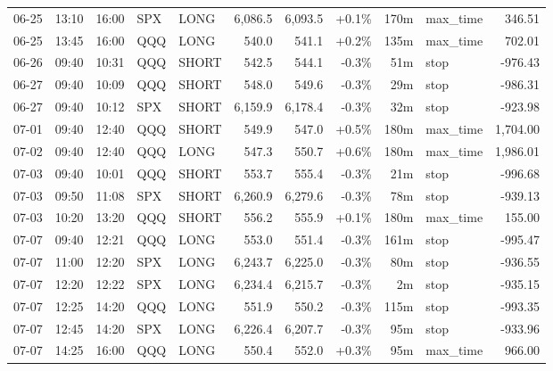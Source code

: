 \documentclass[11pt,a4paper,twoside]{article}
\begin{document}
\begin{center}
\begin{longtable}{>{\color{txtmain}}l l l l l r r r r >{\color{txtmain}}l r}
06-25 & 13:10 & 16:00 & SPX & LONG & 6,086.5 & 6,093.5 & \textcolor{wingreen}{+0.1\%} & 170m & max\_time & \textcolor{wingreen}{346.51} \\
06-25 & 13:45 & 16:00 & QQQ & LONG & 540.0 & 541.1 & \textcolor{wingreen}{+0.2\%} & 135m & max\_time & \textcolor{wingreen}{702.01} \\
06-26 & 09:40 & 10:31 & QQQ & SHORT & 542.5 & 544.1 & \textcolor{lossred}{-0.3\%} & 51m & stop & \textcolor{lossred}{-976.43} \\
06-27 & 09:40 & 10:09 & QQQ & SHORT & 548.0 & 549.6 & \textcolor{lossred}{-0.3\%} & 29m & stop & \textcolor{lossred}{-986.31} \\
06-27 & 09:40 & 10:12 & SPX & SHORT & 6,159.9 & 6,178.4 & \textcolor{lossred}{-0.3\%} & 32m & stop & \textcolor{lossred}{-923.98} \\
07-01 & 09:40 & 12:40 & QQQ & SHORT & 549.9 & 547.0 & \textcolor{wingreen}{+0.5\%} & 180m & max\_time & \textcolor{wingreen}{1,704.00} \\
07-02 & 09:40 & 12:40 & QQQ & LONG & 547.3 & 550.7 & \textcolor{wingreen}{+0.6\%} & 180m & max\_time & \textcolor{wingreen}{1,986.01} \\
07-03 & 09:40 & 10:01 & QQQ & SHORT & 553.7 & 555.4 & \textcolor{lossred}{-0.3\%} & 21m & stop & \textcolor{lossred}{-996.68} \\
07-03 & 09:50 & 11:08 & SPX & SHORT & 6,260.9 & 6,279.6 & \textcolor{lossred}{-0.3\%} & 78m & stop & \textcolor{lossred}{-939.13} \\
07-03 & 10:20 & 13:20 & QQQ & SHORT & 556.2 & 555.9 & \textcolor{wingreen}{+0.1\%} & 180m & max\_time & \textcolor{wingreen}{155.00} \\
07-07 & 09:40 & 12:21 & QQQ & LONG & 553.0 & 551.4 & \textcolor{lossred}{-0.3\%} & 161m & stop & \textcolor{lossred}{-995.47} \\
07-07 & 11:00 & 12:20 & SPX & LONG & 6,243.7 & 6,225.0 & \textcolor{lossred}{-0.3\%} & 80m & stop & \textcolor{lossred}{-936.55} \\
07-07 & 12:20 & 12:22 & SPX & LONG & 6,234.4 & 6,215.7 & \textcolor{lossred}{-0.3\%} & 2m & stop & \textcolor{lossred}{-935.15} \\
07-07 & 12:25 & 14:20 & QQQ & LONG & 551.9 & 550.2 & \textcolor{lossred}{-0.3\%} & 115m & stop & \textcolor{lossred}{-993.35} \\
07-07 & 12:45 & 14:20 & SPX & LONG & 6,226.4 & 6,207.7 & \textcolor{lossred}{-0.3\%} & 95m & stop & \textcolor{lossred}{-933.96} \\
07-07 & 14:25 & 16:00 & QQQ & LONG & 550.4 & 552.0 & \textcolor{wingreen}{+0.3\%} & 95m & max\_time & \textcolor{wingreen}{966.00} \\

\end{longtable}
\end{center}
\end{document}
